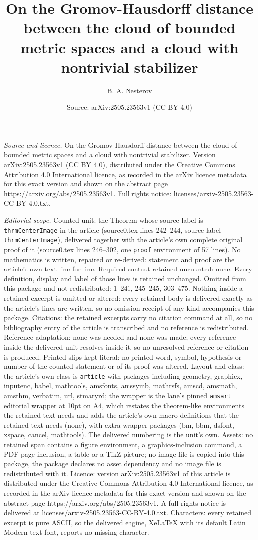 \documentclass[10pt,a4paper]{amsart}
\title[On the Gromov-Hausdorff distance between the cloud of bounde]{On the Gromov-Hausdorff distance between the cloud of bounded metric spaces and a cloud with nontrivial stabilizer}
\author{B. A. Nesterov}
\date{Source: arXiv:2505.23563v1 (CC BY 4.0)}
\begin{document}
\maketitle

\noindent\emph{Source and licence.} On the Gromov-Hausdorff distance between the cloud of bounded metric spaces and a cloud with nontrivial stabilizer. Version arXiv:2505.23563v1 (CC BY 4.0), distributed under the Creative Commons Attribution 4.0 International licence, as recorded in the arXiv licence metadata for this exact version and shown on the abstract page https://arxiv.org/abs/2505.23563v1. Full rights notice: licenses/arxiv-2505.23563-CC-BY-4.0.txt.\par\smallskip

\noindent\textit{Editorial scope.} Counted unit: the Theorem whose source label is \texttt{thrmCenterImage} in the article (source0.tex lines 242--244, source label \texttt{thrmCenterImage}), delivered together with the article's own complete original proof of it (source0.tex lines 246--302, one \texttt{proof} environment of 57 lines). No mathematics is written, repaired or re-derived: statement and proof are the article's own text line for line. Required context retained uncounted: none. Every definition, display and label of those lines is retained unchanged. Omitted from this package and not redistributed: 1--241, 245--245, 303--475. Nothing inside a retained excerpt is omitted or altered: every retained body is delivered exactly as the article's lines are written, so no omission receipt of any kind accompanies this package. Citations: the retained excerpts carry no citation command at all, so no bibliography entry of the article is transcribed and no reference is redistributed. Reference adaptation: none was needed and none was made; every reference inside the delivered unit resolves inside it, so no unresolved reference or citation is produced. Printed slips kept literal: no printed word, symbol, hypothesis or number of the counted statement or of its proof was altered. Layout and class: the article's own class is \texttt{article} with packages including geometry, graphicx, inputenc, babel, mathtools, amsfonts, amssymb, mathrsfs, amscd, amsmath, amsthm, verbatim, url, stmaryrd; the wrapper is the lane's pinned \texttt{amsart} editorial wrapper at 10pt on A4, which restates the theorem-like environments the retained text needs and adds the article's own macro definitions that the retained text needs (none), with extra wrapper packages (bm, bbm, dsfont, xspace, cancel, mathtools). The delivered numbering is the unit's own. Assets: no retained span contains a figure environment, a graphics-inclusion command, a PDF-page inclusion, a table or a TikZ picture; no image file is copied into this package, the package declares no asset dependency and no image file is redistributed with it. Licence: version arXiv:2505.23563v1 of this article is distributed under the Creative Commons Attribution 4.0 International licence, as recorded in the arXiv licence metadata for this exact version and shown on the abstract page https://arxiv.org/abs/2505.23563v1. A full rights notice is delivered at licenses/arxiv-2505.23563-CC-BY-4.0.txt. Characters: every retained excerpt is pure ASCII, so the delivered engine, XeLaTeX with its default Latin Modern text font, reports no missing character.
\end{document}
